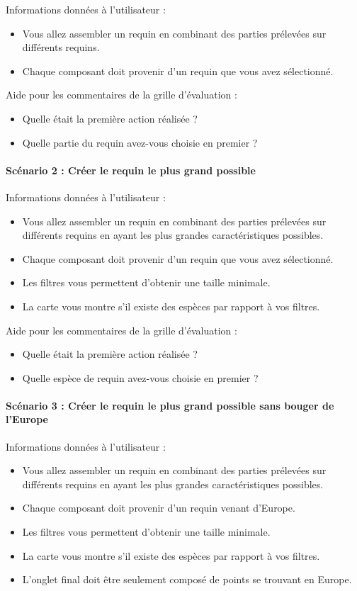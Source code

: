 \documentclass{article}
\begin{document}
Informations données à l'utilisateur :
\begin{itemize}
	\item Vous allez assembler un requin en combinant des parties prélevées sur différents requins.
	\item Chaque composant doit provenir d'un requin que vous avez sélectionné.
\end{itemize}

Aide pour les commentaires de la grille d'évaluation :
\begin{itemize}
	\item Quelle était la première action réalisée ?
	\item Quelle partie du requin avez-vous choisie en premier ?
\end{itemize}

\paragraph{Scénario 2 : Créer le requin le plus grand possible}

Informations données à l'utilisateur :
\begin{itemize}
	\item Vous allez assembler un requin en combinant des parties prélevées sur différents requins en ayant les plus grandes caractéristiques possibles.
	\item Chaque composant doit provenir d'un requin que vous avez sélectionné.
	\item Les filtres vous permettent d'obtenir une taille minimale.
	\item La carte vous montre s'il existe des espèces par rapport à vos filtres.
\end{itemize}

Aide pour les commentaires de la grille d'évaluation :
\begin{itemize}
	\item Quelle était la première action réalisée ?
	\item Quelle espèce de requin avez-vous choisie en premier ?
\end{itemize}

\paragraph{Scénario 3 : Créer le requin le plus grand possible sans bouger de l'Europe}

Informations données à l'utilisateur :
\begin{itemize}
	\item Vous allez assembler un requin en combinant des parties prélevées sur différents requins en ayant les plus grandes caractéristiques possibles.
	\item Chaque composant doit provenir d'un requin venant d'Europe.
	\item Les filtres vous permettent d'obtenir une taille minimale.
	\item La carte vous montre s'il existe des espèces par rapport à vos filtres.
	\item L'onglet final doit être seulement composé de points se trouvant en Europe.
\end{itemize}
\end{document}
